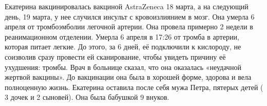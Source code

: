 Екатерина вакцинировалась вакциной AstraZeneca 18 марта, а на следующий день, 19
марта, у нее случился инсульт с кровоизлиянием в мозг. Она умерла 6 апреля от
тромбоэмболии легочной артерии. Она провела примерно 2 недели в реанимационном
отделении. Умерла 6 апреля в 17:26 от тромба в артерии, которая питает
легкие. До этого, за 6 дней, её подключили к кислороду, не соизволив сразу
провести ей сканирование, чтобы увидеть причину её ухудшения: тромбы. Врач в
больнице сказал, что она оказалась «неудачной жертвой вакцины». До вакцинации
она была в хорошей форме, здорова и вела полноценную жизнь. Екатерина оставила
после себя мужа Петра, пятерых детей ( 3 дочек и 2 сыновей). Она была бабушкой 9
внуков.

